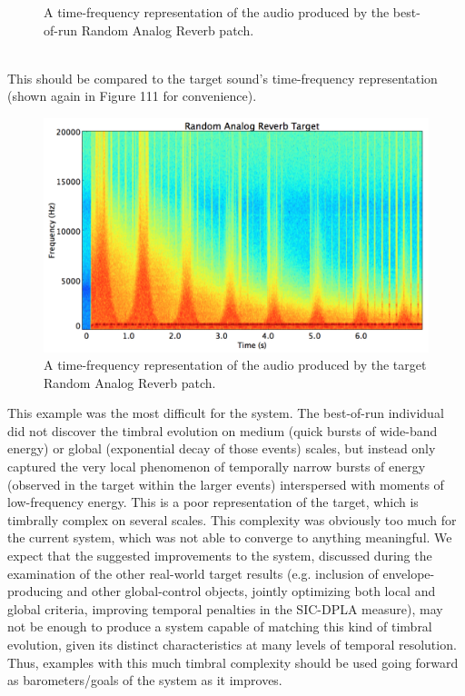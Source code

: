 \documentclass[12pt]{report} 	%
\numberwithin{figure}{chapter}
\numberwithin{table}{chapter}
\numberwithin{equation}{chapter}
\begin{document}
\begin{flushleft}
\begin{figure}[h!]
\begin{center}
\caption[Best-of-run random analog reverb time-frequency representation]{A time-frequency representation of the audio produced by the best-of-run Random Analog Reverb patch.}
\end{center}
\end{figure}
\\
This should be compared to the target sound's time-frequency representation (shown again in Figure 111 for convenience).
\begin{figure}[h!]
\begin{center}
\includegraphics[scale=0.35,width=\linewidth]{RandomAnalogReverbTargetSTFT}
\caption[Target random analog reverb time-frequency representation]{A time-frequency representation of the audio produced by the target Random Analog Reverb patch.}
\end{center}
\end{figure}
This example was the most difficult for the system. The best-of-run individual did not discover the timbral evolution on medium (quick bursts of wide-band energy) or global (exponential decay of those events) scales, but instead only captured the very local phenomenon of temporally narrow bursts of energy (observed in the target within the larger events) interspersed with moments of low-frequency energy. This is a poor representation of the target, which is timbrally complex on several scales. This complexity was obviously too much for the current system, which was not able to converge to anything meaningful. We expect that the suggested improvements to the system, discussed during the examination of the other real-world target results (e.g. inclusion of envelope-producing and other global-control objects, jointly optimizing both local and global criteria, improving temporal penalties in the SIC-DPLA measure), may not be enough to produce a system capable of matching this kind of timbral evolution, given its distinct characteristics at many levels of temporal resolution. Thus, examples with this much timbral complexity should be used going forward as barometers/goals of the system as it improves.


\end{flushleft}
\end{document}
